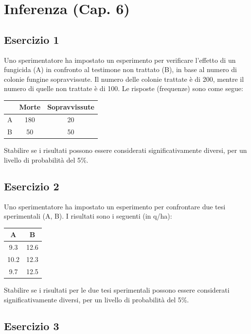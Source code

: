 \documentclass[a4paper,12pt,oneside]{book}
\begin{document}
\hypertarget{inferenza-cap.-6}{%
\section{Inferenza (Cap. 6)}\label{inferenza-cap.-6}}

\hypertarget{esercizio-1-4}{%
\subsection{Esercizio 1}\label{esercizio-1-4}}

Uno sperimentatore ha impostato un esperimento per verificare l'effetto di un fungicida (A) in confronto al testimone non trattato (B), in base al numero di colonie fungine sopravvissute. Il numero delle colonie trattate è di 200, mentre il numero di quelle non trattate è di 100. Le risposte (frequenze) sono come segue:

\begin{longtable}[]{@{}lcc@{}}
\toprule
& Morte & Sopravvissute \\
\midrule
\endhead
A & 180 & 20 \\
B & 50 & 50 \\
\bottomrule
\end{longtable}

Stabilire se i risultati possono essere considerati significativamente diversi, per un livello di probabilità del 5\%.

\hypertarget{esercizio-2-4}{%
\subsection{Esercizio 2}\label{esercizio-2-4}}

Uno sperimentatore ha impostato un esperimento per confrontare due tesi sperimentali (A, B). I risultati sono i seguenti (in q/ha):

\begin{longtable}[]{@{}cc@{}}
\toprule
A & B \\
\midrule
\endhead
9.3 & 12.6 \\
10.2 & 12.3 \\
9.7 & 12.5 \\
\bottomrule
\end{longtable}

Stabilire se i risultati per le due tesi sperimentali possono essere considerati significativamente diversi, per un livello di probabilità del 5\%.

\hypertarget{esercizio-3-4}{%
\subsection{Esercizio 3}\label{esercizio-3-4}}
\end{document}

